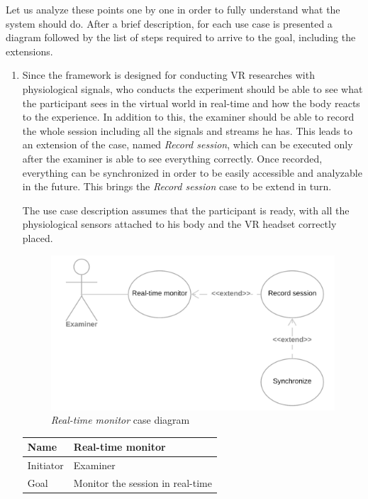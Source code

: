 \documentclass[binding=0.6cm,LaM]{sapthesis}
\begin{document}
Let us analyze these points one by one in order to fully understand what the system should do. After a brief description, for each use case is presented a diagram followed by the list of steps required to arrive to the goal, including the extensions.

\begin{enumerate}

\item Since the framework is designed for conducting VR researches with physiological signals, who conducts the experiment should be able to see what the participant sees in the virtual world in real-time and how the body reacts to the experience. 
In addition to this, the examiner should be able to record the whole session including all the signals and streams he has. This leads to an extension of the case, named \textit{Record session}, which can be executed only after the examiner is able to see everything correctly.
Once recorded, everything can be synchronized in order to be easily accessible and analyzable in the future. This brings the \textit{Record session} case to be extend in turn. 

The use case description assumes that the participant is ready, with all the physiological sensors attached to his body and the VR headset correctly placed.

\begin{figure}[h]
\centering
\includegraphics[scale=.24]{images/use_case_1}
\caption{\textit{Real-time monitor} case diagram}
\end{figure}

\renewcommand{\arraystretch}{1.5}
\begin{center}
\begin{tabular}{| l | l |}
  \hline			
  Name & Real-time monitor \\
  \hline
  Initiator & Examiner \\
  \hline
  Goal & Monitor the session in real-time \\
  \hline  
\end{tabular}


\end{center}
\end{enumerate}
\end{document}
